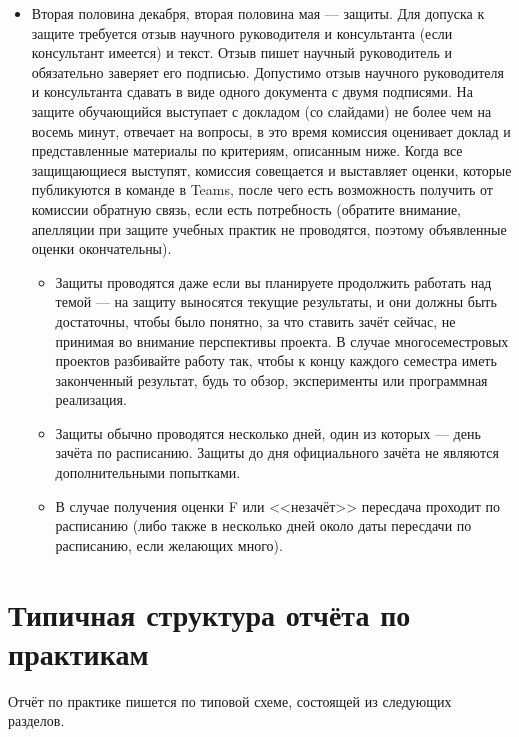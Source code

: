 \documentclass{article}
\begin{document}
\begin{itemize}
    \item Вторая половина декабря, вторая половина мая --- защиты. Для допуска к защите требуется отзыв научного руководителя и консультанта (если консультант имеется) и текст. Отзыв пишет научный руководитель и обязательно заверяет его подписью. Допустимо отзыв научного руководителя и консультанта сдавать в виде одного документа с двумя подписями. На защите обучающийся выступает с докладом (со слайдами) не более чем на восемь минут, отвечает на вопросы, в это время комиссия оценивает доклад и представленные материалы по критериям, описанным ниже. Когда все защищающиеся выступят, комиссия совещается и выставляет оценки, которые публикуются в команде в Teams, после чего есть возможность получить от комиссии обратную связь, если есть потребность (обратите внимание, апелляции при защите учебных практик не проводятся, поэтому объявленные оценки окончательны).
    \begin{itemize}
        \item Защиты проводятся даже если вы планируете продолжить работать над темой --- на защиту выносятся текущие результаты, и они должны быть достаточны, чтобы было понятно, за что ставить зачёт сейчас, не принимая во внимание перспективы проекта. В случае многосеместровых проектов разбивайте работу так, чтобы к концу каждого семестра иметь законченный результат, будь то обзор, эксперименты или программная реализация.
        \item Защиты обычно проводятся несколько дней, один из которых --- день зачёта по расписанию. Защиты до дня официального зачёта не являются дополнительными попытками.
        \item В случае получения оценки F или <<незачёт>> пересдача проходит по расписанию (либо также в несколько дней около даты пересдачи по расписанию, если желающих много).
    \end{itemize}
\end{itemize}

\section{Типичная структура отчёта по практикам}

Отчёт по практике пишется по типовой схеме, состоящей из следующих разделов.
\end{document}
